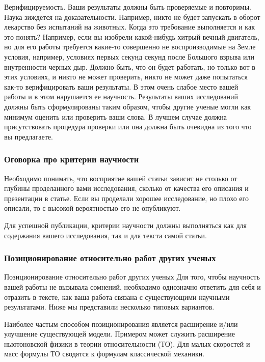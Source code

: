 \documentclass{report}
\begin{document}
Верифицируемость. Ваши результаты должны быть проверяемые и повторимы. Наука зиждется на доказательности. Например, никто не будет запускать в оборот лекарство без испытаний на животных. Когда это требование выполняется и как это понять? Например, если вы изобрели какой-нибудь хитрый вечный двигатель, но для его работы требуется какие-то совершенно не воспроизводимые на Земле условия, например, условиях первых секунд секунд после Большого взрыва или внутренности черных дыр. Должно быть, что он будет работать, но только вот в этих условиях, и никто не может проверить, никто не может даже попытаться как-то верифицировать ваши результаты. В этом очень слабое место вашей работы и в этом нарушается ее научность. Результаты ваших исследований должны быть сформулированы таким образом, чтобы другие ученые могли как минимум оценить или проверить ваши слова. В лучшем случае должна присутствовать процедура проверки или она должна быть очевидна из того что вы предлагаете.

\subsubsection{Оговорка про критерии научности}

Необходимо понимать, что восприятие вашей статьи зависит не столько от глубины проделанного вами исследования, сколько от качества его описания и презентации в статье. Если вы проделали хорошее исследование, но плохо его описали, то с высокой вероятностью его не опубликуют.

Для успешной публикации, критерии научности должны выполняться как для содержания вашего исследования, так и для текста самой статьи.

\subsubsection{Позиционирование относительно работ других ученых}
Позиционирование относительно работ других ученых
Для того, чтобы научность вашей работы не вызывала сомнений, необходимо однозначно ответить для себя и отразить в тексте, как ваша работа связана с существующими научными результатами. Ниже мы представили несколько типовых вариантов.

Наиболее частым способом позиционирования является расширение и/или улучшение существующей модели. Примером может служить расширение ньютоновской физики в теории относительности (ТО). Для малых скоростей и масс формулы ТО сводятся к формулам классической механики.
\end{document}
